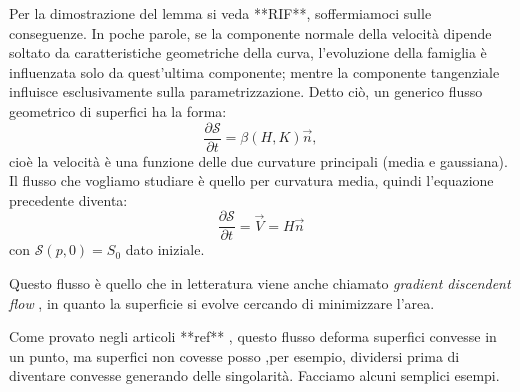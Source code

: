 Per la dimostrazione del lemma si veda **RIF**, soffermiamoci sulle conseguenze.
In poche parole, se la componente normale della velocità dipende soltato da caratteristiche geometriche della curva, l'evoluzione della famiglia è influenzata solo da quest'ultima componente; mentre la componente tangenziale influisce esclusivamente sulla parametrizzazione.
Detto ciò, un generico flusso geometrico di superfici ha la forma:
\[
\frac{\partial\mathcal{S}}{\partial t} = \beta(H,K)\vec{n},
\] 
cioè la velocità è una funzione delle due curvature principali (media e gaussiana). Il flusso che vogliamo studiare è quello per curvatura media, quindi l'equazione precedente diventa:
\begin{equation}
  \label{eq:cp-123}
  \frac{\partial\mathcal{S}}{\partial t} = \vec{V} = H\vec{n}
\end{equation}
con $\mathcal{S}(p,0)=S_0$ dato iniziale.
\begin{osservazione}
Questo flusso è quello che in letteratura viene anche chiamato \emph{gradient discendent flow} , in quanto la superficie si evolve cercando di minimizzare l'area. 
\end{osservazione}
\begin{osservazione}
Come provato negli articoli **ref** , questo flusso deforma superfici convesse in un punto, ma superfici non covesse posso ,per esempio, dividersi prima di diventare convesse generando delle singolarità. Facciamo alcuni semplici esempi.
\end{osservazione}

